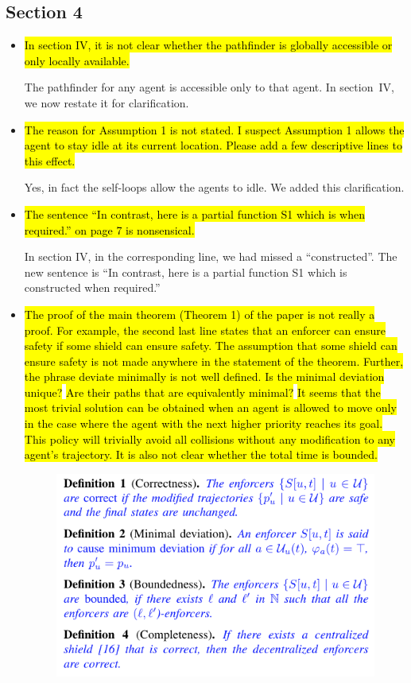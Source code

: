 \documentclass{article}[12pt]
\begin{document}
\subsection*{Section 4}

\begin{itemize}
   
\item \hl{In section IV, it is not clear whether the pathfinder is globally accessible or only locally available.}

The pathfinder for any agent is accessible only to that agent. In section~IV, we now restate it for clarification. 

\item \hl{The reason for Assumption 1 is not stated. I suspect Assumption 1 allows the agent to stay idle at its current location. Please add a few descriptive lines to this effect.}

Yes, in fact the self-loops allow the agents to idle. We added this clarification.

\item \hl{The sentence ``In contrast, here is a partial function S1 which is when required.'' on page 7 is nonsensical. }
	
In section IV, in the corresponding line, we had missed a “constructed”. The new sentence is “In contrast, here is a partial function S1 which is constructed when required.”

\item \hl{ The proof of the main theorem (Theorem 1) of the paper is not really a proof. For example, the second last line states that an enforcer can ensure safety if some shield can ensure safety. The assumption that some shield can ensure safety is not made anywhere in the statement of the theorem. Further, the phrase deviate minimally is not well defined. Is the minimal deviation unique?}
\hl{Are their paths that are equivalently minimal?} \hl{It seems that the most trivial solution can be obtained when an agent is allowed to move only in the case where the agent with the next higher priority reaches its goal. This policy will trivially avoid all collisions without any modification to any agent's trajectory. It is also not clear whether the total time is bounded. }
\begin{figure}[h]
    \centering
    \includegraphics[scale=0.9]{defns.png}
\end{figure}


\end{itemize}
\end{document}

